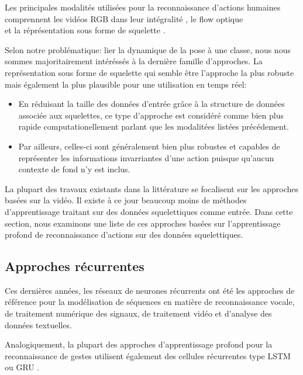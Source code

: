 Les principales modalités utilisées pour la reconnaissance d'actions humaines comprennent les vidéos RGB dans leur intégralité \cite{donahue2015long,2014arXiv1412.0767T,varol2017long,Wu_2018_CVPR}, le flow optique \cite{simonyan2014two}\\\cite{zhang2016real}\cite{sevilla2018integration,DanutPOP} et la réprésentation sous forme de squelette \cite{vemulapalli2014human,du2015hierarchical,2016arXiv160707043L,2018arXiv180107455Y}.

Selon notre problématique: lier la dynamique de la pose à une classe, nous nous sommes majoritairement intéréssés à la dernière famille d'approches. La représentation sous forme de squelette qui semble être l'approche la plus robuste mais également la plus plausible pour une utilisation en temps réel:

\begin{itemize}
    \item En réduisant la taille des données d'entrée grâce à la structure de données associée aux squelettes, ce type d'approche est considéré comme bien plus rapide computationellement parlant que les modalitées listées précédement.
    \item Par ailleurs, celles-ci sont généralement bien plus robustes et capables de représenter les informations invarriantes d'une action puisque qu'aucun contexte de fond n'y est inclus.
\end{itemize}

La plupart des travaux existants dans la littérature se focalisent sur les approches basées sur la vidéo. Il existe à ce jour beaucoup moins de méthodes d'apprentissage traitant sur des données squelettiques comme entrée. Dans cette section, nous examinons une liste de ces approches basées sur l'apprentissage profond de reconnaissance d'actions sur des données squelettiques.

\subsection{Approches récurrentes}

Ces dernières années, les réseaux de neurones récurrents ont  été les approches de référence pour la modélisation de séquences en matière de reconnaissance vocale, de traitement numérique des signaux, de traitement vidéo et d'analyse des données textuelles. 


Analogiquement, la plupart des approches d'apprentissage profond pour la reconnaissance de gestes utilisent également des cellules récurrentes type LSTM\\ \cite{hochreiter1997long} ou GRU \cite{2014arXiv1406.1078C}.

